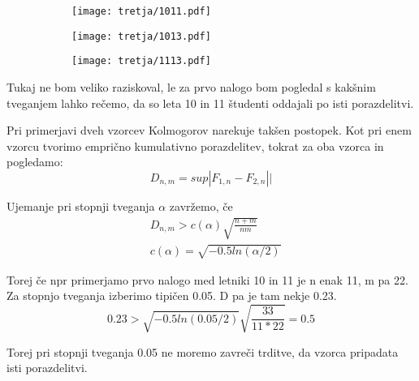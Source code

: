 \documentclass{article}
\begin{document}
\begin{figure}[H]
\centering
\begin{subfigure}{.7\textwidth}
\texttt{[image: tretja/1011.pdf]}
\end{subfigure}
\end{figure}
\begin{figure}[H]
\centering
\begin{subfigure}{.7\textwidth}
\texttt{[image: tretja/1013.pdf]}
\end{subfigure}
\end{figure}
\begin{figure}[H]
\centering
\begin{subfigure}{.7\textwidth}
\texttt{[image: tretja/1113.pdf]}
\end{subfigure}
\end{figure}


Tukaj ne bom veliko raziskoval, le za prvo nalogo bom pogledal s kakšnim tveganjem lahko rečemo, da so leta 10 in 11 študenti oddajali po isti porazdelitvi.

Pri primerjavi dveh vzorcev Kolmogorov narekuje takšen postopek. Kot pri enem vzorcu tvorimo emprično kumulativno porazdelitev, tokrat za oba vzorca in pogledamo:
\begin{equation*}
D_{n,m} = sup|F_{1,n} - F_{2,n}||
\end{equation*}

Ujemanje pri stopnji tveganja $\alpha$ zavržemo, če
\begin{align*}
&D_{n,m} > c(\alpha) \sqrt{\frac{n+m}{nm}} \\
&c(\alpha) = \sqrt{-0.5 ln(\alpha/2)}
\end{align*}

Torej če npr primerjamo prvo nalogo med letniki 10 in 11 je n enak 11, m pa 22. Za stopnjo tveganja izberimo tipičen 0.05. D pa je tam nekje 0.23.
\begin{equation*}
0.23 > \sqrt{-0.5 ln(0.05/2)} \sqrt{\frac{33}{11*22}} = 0.5
\end{equation*}

Torej pri stopnji tveganja 0.05 ne moremo zavreči trditve, da vzorca pripadata isti porazdelitvi.
\end{document}
